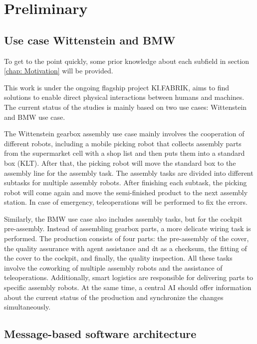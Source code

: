 \chapter{Preliminary} \label{chap: Preliminary}

\section{Use case Wittenstein and BMW}
To get to the point quickly, some prior knowledge about each 
subfield in section \ref{chap: Motivation} will be provided. 

This work is under the ongoing flagship project KI.FABRIK, aims to 
find solutions to enable direct physical interactions between humans and 
machines. The current status of the studies is mainly based on two use 
cases: Wittenstein and BMW use case. 

The Wittenstein gearbox assembly use case mainly involves the cooperation of different 
robots, including a mobile picking robot that collects assembly parts from 
the supermarket cell with a shop list and then puts them into a standard box (KLT). 
After that, the picking robot will move the standard box to the assembly line for 
the assembly task. The assembly tasks are divided into different subtasks for 
multiple assembly robots. After finishing each subtask, the picking robot 
will come again and move the semi-finished product to the next assembly station. 
In case of emergency, teleoperations will be performed to fix the 
errors. 

Similarly, the BMW use case also includes assembly tasks, but for the cockpit 
pre-assembly. Instead of assembling gearbox parts, a more delicate wiring task 
is performed. The production consists of four parts: the pre-assembly of the cover, 
the quality assurance with agent 
assistance and \gls{dt} as a checksum, the fitting of the cover to the cockpit, and 
finally, the quality inspection. All these tasks involve the coworking of 
multiple assembly robots and the assistance of teleoperations. Additionally, 
smart logistics are responsible for delivering parts to 
specific assembly robots. At the same time, a central AI should offer information about the current status of 
the production and synchronize the changes simultaneously. 


\section{Message-based software architecture}

